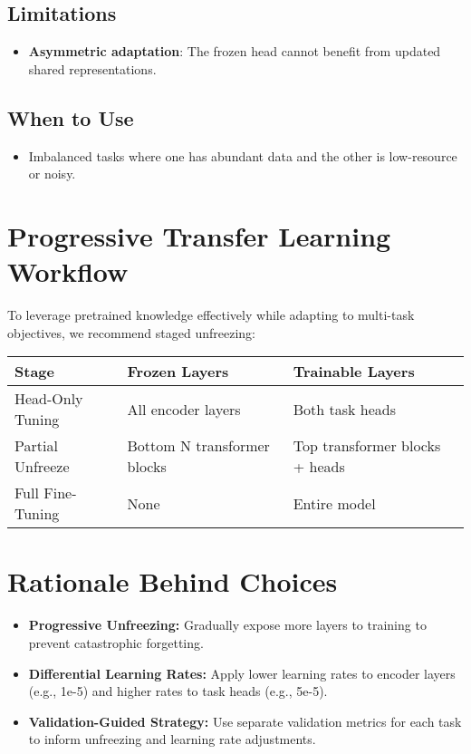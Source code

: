 \documentclass{article}
\begin{document}
\subsection*{Limitations}
\begin{itemize}
  \item \textbf{Asymmetric adaptation}: The frozen head cannot benefit from updated shared representations.
\end{itemize}

\subsection*{When to Use}
\begin{itemize}
  \item Imbalanced tasks where one has abundant data and the other is low-resource or noisy.
\end{itemize}

\section{Progressive Transfer Learning Workflow}
To leverage pretrained knowledge effectively while adapting to multi-task objectives, we recommend staged unfreezing:

\begin{center}
\begin{tabular}{l l l}
\toprule
\textbf{Stage} & \textbf{Frozen Layers} & \textbf{Trainable Layers} \\
\midrule
Head-Only Tuning   & All encoder layers                & Both task heads           \\
Partial Unfreeze   & Bottom N transformer blocks       & Top transformer blocks + heads \\
Full Fine-Tuning   & None                              & Entire model              \\
\bottomrule
\end{tabular}
\end{center}

\section{Rationale Behind Choices}
\begin{itemize}
  \item \textbf{Progressive Unfreezing:} Gradually expose more layers to training to prevent catastrophic forgetting.
  \item \textbf{Differential Learning Rates:} Apply lower learning rates to encoder layers (e.g., 1e-5) and higher rates to task heads (e.g., 5e-5).
  \item \textbf{Validation-Guided Strategy:} Use separate validation metrics for each task to inform unfreezing and learning rate adjustments.
\end{itemize}
\end{document}
